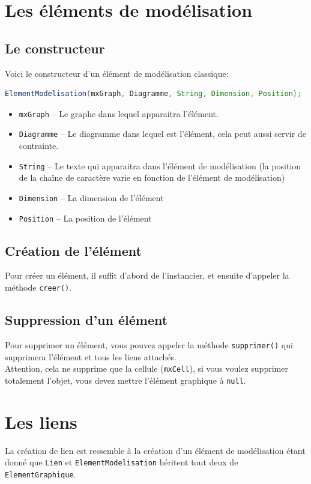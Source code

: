 \documentclass[12pt,a4paper,oneside]{book}
\begin{document}
	\section{Les éléments de modélisation}
	\subsection{Le constructeur}
	Voici le constructeur d'un élément de modélisation classique: 
	\begin{lstlisting}[language=Java]
ElementModelisation(mxGraph, Diagramme, String, Dimension, Position);
	\end{lstlisting}
	\begin{itemize}
		\item \texttt{mxGraph} -- Le graphe dans lequel apparaitra l'élément.
		\item \texttt{Diagramme} -- Le diagramme dans lequel est l'élément, cela peut aussi servir de contrainte.
		\item \texttt{String} -- Le texte qui apparaitra dans l'élément de modélisation (la position de la chaîne de caractère varie en fonction de l'élément de modélisation)
		\item \texttt{Dimension} -- La dimension de l'élément
		\item \texttt{Position} -- La position de l'élément
	\end{itemize}
	\subsection{Création de l'élément}
	Pour créer un élément, il suffit d'abord de l'instancier, et ensuite d'appeler la méthode \texttt{creer()}.
	\subsection{Suppression d'un élément} 
	Pour supprimer un élément, vous pouvez appeler la méthode \texttt{supprimer()} qui supprimera l'élément et tous les liens attachés.\\
	Attention, cela ne supprime que la cellule (\texttt{mxCell}), si vous voulez supprimer totalement l'objet, vous devez mettre l'élément graphique à \texttt{null}.
	\section{Les liens}
	La création de lien est ressemble à la création d'un élément de modélisation étant donné que \texttt{Lien} et \texttt{ElementModelisation} héritent tout deux
	de \texttt{ElementGraphique}. 
\end{document}
